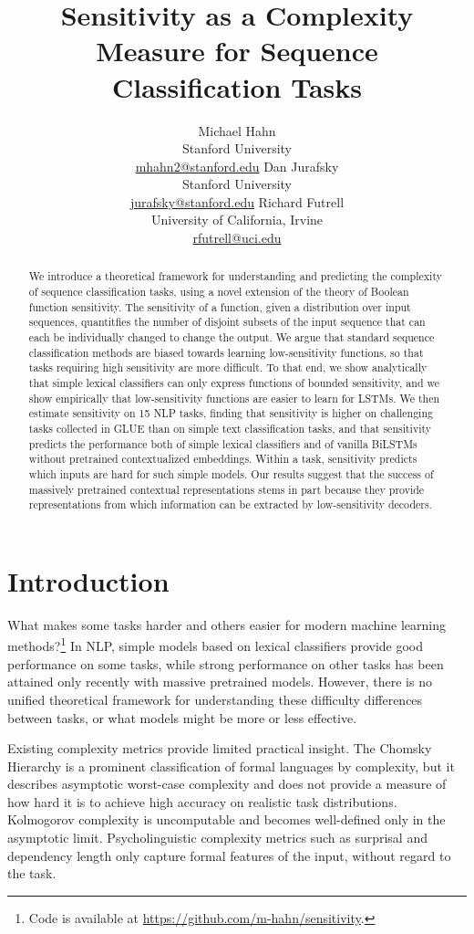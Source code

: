 \documentclass[11pt,a4paper]{article}
\title{Sensitivity as a  Complexity Measure for Sequence Classification Tasks}
\date{}
\author{Michael Hahn \\ Stanford University \\ \url{mhahn2@stanford.edu} \And Dan Jurafsky \\ Stanford University \\ \url{jurafsky@stanford.edu} \And Richard Futrell \\ University of California, Irvine \\ \url{rfutrell@uci.edu}}
\begin{document}
\maketitle


\begin{abstract}
We introduce a theoretical framework for understanding and predicting the complexity of sequence classification tasks, using a novel extension of the theory of Boolean function sensitivity.
The sensitivity of a function, given a distribution over input sequences, quantitfies the number of disjoint subsets of the input sequence that can each be individually changed to change the output.
We argue that standard sequence classification methods are biased towards learning low-sensitivity functions, so that tasks requiring high sensitivity are more difficult.
To that end, we show analytically that simple lexical classifiers can only express functions of bounded sensitivity, and we show empirically that low-sensitivity functions are easier to learn for LSTMs.
We then estimate sensitivity on 15 NLP tasks, finding that sensitivity is higher on challenging tasks collected in GLUE than on simple text classification tasks, and that sensitivity predicts the performance both of simple lexical classifiers and of vanilla BiLSTMs without pretrained contextualized embeddings.
Within a task, sensitivity predicts which inputs are hard for such simple models.
Our results suggest that the success of massively pretrained contextual representations stems in part because they provide representations from which information can be extracted by low-sensitivity decoders.
\end{abstract}


\section{Introduction}
What makes some tasks harder and others easier for modern machine learning methods?\footnote{Code is available at \url{https://github.com/m-hahn/sensitivity}.}
In NLP, simple models based on lexical classifiers provide good performance on some tasks, while strong performance on other tasks has been attained only recently with massive pretrained models.
However, there is no unified theoretical framework for understanding these difficulty differences between tasks, or what models might be more or less effective.

Existing complexity metrics provide limited practical insight. %
The Chomsky Hierarchy \citep{chomsky1956three} is a prominent classification of formal languages by complexity,
but it describes asymptotic worst-case complexity and does not provide a measure of how hard it is to achieve high accuracy on realistic task distributions.
Kolmogorov complexity \citep{li1993an} is uncomputable and becomes well-defined only in the asymptotic limit.
Psycholinguistic complexity metrics such as surprisal \citep{hale2001probabilistic} and dependency length \citep{gibson1998linguistic} only capture formal features of the input, without regard to the task.
\end{document}
